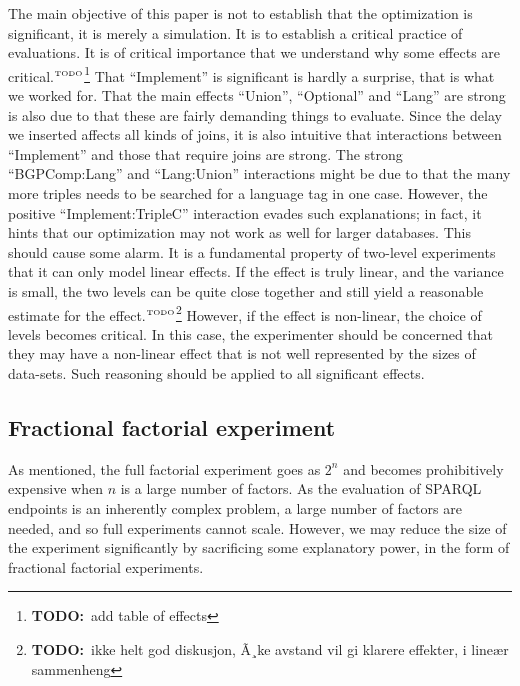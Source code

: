 \documentclass{llncs}
\newcommand{\todo}[1]{\ensuremath{^{\textrm{\tiny{TODO}\normalsize}}}\footnote{\textbf{TODO:}~#1}}
\begin{document}
The main objective of this paper is not to establish that the
optimization is significant, it is merely a simulation. It is to
establish a critical practice of evaluations. It is of critical
importance that we understand why some effects are critical.\todo{add
  table of effects} That
``Implement'' is significant is hardly a surprise, that is what we
worked for. That the main effects ``Union'', ``Optional'' and ``Lang''
are strong is also due to that these are fairly demanding things to
evaluate. Since the delay we inserted affects all kinds of joins, it
is also intuitive that interactions between ``Implement'' and those
that require joins are strong. The strong ``BGPComp:Lang'' and
``Lang:Union'' interactions might be due to that the many more triples
needs to be searched for a language tag in one case. However, the
positive ``Implement:TripleC'' interaction evades such explanations;
in fact, it hints that our optimization may not work as well for
larger databases. This should cause some alarm. It is a fundamental
property of two-level experiments that it can only model linear
effects. If the effect is truly linear, and the variance is small, the
two levels can be quite close together and still yield a reasonable
estimate for the effect.\todo{ikke helt god diskusjon, Ã¸ke avstand vil
gi klarere effekter, i lineær sammenheng} However, if the effect is non-linear, the
choice of levels becomes critical. In this case, the experimenter
should be concerned that they may have a non-linear effect that is not
well represented by the sizes of data-sets. Such reasoning should be
applied to all significant effects.



\subsection{Fractional factorial experiment}\label{sec:frac}

As mentioned, the full factorial experiment goes as $2^n$ and becomes
prohibitively expensive when $n$ is a large number of
factors. As the evaluation of SPARQL endpoints is an inherently complex
problem, a large number of factors are needed, and so full experiments
cannot scale. However, we may reduce the size of the experiment
significantly by sacrificing some explanatory power, in the form of
fractional factorial experiments. 
\end{document}
